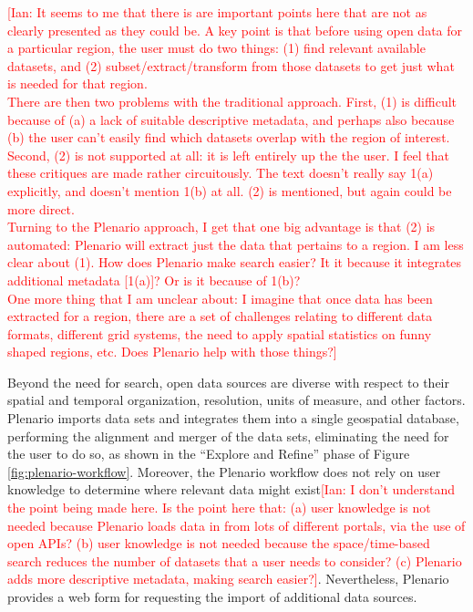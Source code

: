 \documentclass[11pt]{article}
\newcommand{\ian}[1]{\textcolor{Red}{[Ian: #1]}}
\newcommand{\ian}[1]{}
\begin{document}
\ian{It seems to me that there is are important points here that are not as clearly presented as they could be.
A key point is that before using open data for a particular region, the user must do two things: (1) find relevant available datasets, and (2) subset/extract/transform
from those datasets to get just what is needed for that region. 
\\
There are then two problems with the traditional approach. First, (1) is difficult because of (a) a lack of suitable descriptive metadata, and perhaps 
also because (b) the user can't easily find which datasets overlap with the region of interest. Second, (2) is not supported at all: it is left entirely up the the user.
I feel that these critiques are made rather circuitously.  The text doesn't really say 1(a) explicitly, and doesn't mention 1(b) at all. (2) is mentioned, but again could be more direct.
\\
Turning to the Plenario approach, I get that one big advantage is that (2) is automated: Plenario will extract just the data that pertains to a region.
I am less clear about (1). How does Plenario make search easier? It it because it integrates additional metadata [1(a)]? Or is it because of 1(b)?
\\
One more thing that I am unclear about: I imagine that once data has been extracted for a region, there are a set of challenges relating to different data formats, different
grid systems, the need to apply spatial statistics on funny shaped regions, etc. Does Plenario help with those things?}

Beyond the need for search, open data sources are diverse with respect to their spatial and temporal organization, resolution, units of measure, and other factors. Plenario imports data sets and integrates them into a single geospatial database, performing the alignment and merger of the data sets, eliminating the need for the user to do so, as shown in the ``Explore and Refine'' phase of Figure \ref{fig:plenario-workflow}. Moreover, the Plenario workflow does not rely on user knowledge to determine where relevant data might exist\ian{I don't understand the point being made here. Is the point here that: (a) user knowledge is not needed because Plenario loads data in from lots of different portals, via the use of open APIs? (b) user knowledge is not needed because the space/time-based search reduces the number of datasets that a user needs to consider? (c) Plenario adds more descriptive metadata, making search easier?}. Nevertheless, Plenario provides a web form for requesting the import of additional data sources. 
\end{document}
